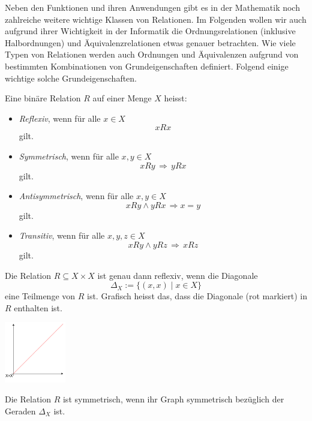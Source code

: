 Neben den Funktionen und ihren Anwendungen gibt es in der Mathematik noch zahlreiche weitere wichtige Klassen von Relationen. Im Folgenden wollen wir auch aufgrund ihrer Wichtigkeit in der Informatik die Ordnungsrelationen (inklusive Halbordnungen) und Äquivalenzrelationen etwas genauer betrachten. Wie viele Typen von Relationen werden auch Ordnungen und Äquivalenzen aufgrund von bestimmten Kombinationen von Grundeigenschaften definiert. Folgend einige wichtige solche Grundeigenschaften.


\begin{df}
    Eine binäre Relation $R$ auf einer Menge $X$ heisst:
    \begin{itemize}
    \item \textit{Reflexiv}, wenn für alle $x\in X$
    \[
    xRx
    \]
    gilt.
    \item \textit{Symmetrisch}, wenn für alle $x,y\in X$
    \[
    xRy\,\Rightarrow\, yRx
    \]
    gilt.
    \item \textit{Antisymmetrisch}, wenn für alle $x,y\in X$
    \[
    xRy\land yRx\,\Rightarrow x=y
    \]
    gilt.
    \item \textit{Transitiv}, wenn für alle $x,y,z\in X$
    \[
    xRy\land yRz\,\Rightarrow \, xRz
    \]
    gilt.
    \end{itemize}
    \end{df}


    \begin{rk}
    Die Relation $R\subseteq X\times X$ ist genau dann reflexiv, wenn die Diagonale
    \[
    \Delta_X:=\{(x,x)\mid x\in X \}
    \]
    eine Teilmenge von $R$ ist. Grafisch heisst das, dass die Diagonale (rot markiert) in $R$ enthalten ist.
    \begin{center}
    \includegraphics[width=0.2\textwidth]{figures/diagonale}
    \end{center}
    Die Relation $R$ ist symmetrisch, wenn ihr Graph symmetrisch bezüglich der Geraden $\Delta_X$ ist.
    \end{rk}


